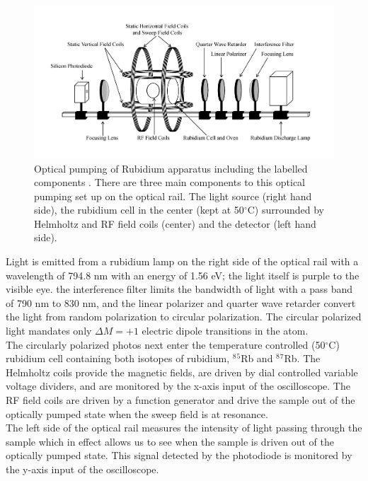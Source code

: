 \documentclass[prb,preprint]{revtex4-1}
\begin{document}
\begin{figure}[h]
\centering
\includegraphics[width=16cm]{exp.jpg}
\caption{Optical pumping of Rubidium apparatus including the labelled components \cite{rib}. There are three main components to this optical pumping set up on the optical rail. The light source (right hand side), the rubidium cell in the center (kept at 50$^{\circ}$C) surrounded by Helmholtz and RF field coils (center) and the detector (left hand side). }
\label{exp}
\end{figure}


Light is emitted from a rubidium lamp on the right side of the optical rail with a wavelength of 794.8 nm with an energy of 1.56 eV; the light itself is purple to the visible eye.  the interference filter limits the bandwidth of light with a pass band of 790 nm to 830 nm, and the linear polarizer and quarter wave retarder convert the light from random polarization to circular polarization. The circular polarized light mandates only $\Delta M=+1$ electric dipole transitions in the atom.\\

The circularly polarized photos next enter the temperature controlled (50$^{\circ}$C) rubidium cell containing both isotopes of rubidium,   $^8$$^5$Rb and $^8$$^7$Rb. The Helmholtz coils provide the magnetic fields, are driven by dial controlled variable voltage dividers, and are monitored by the x-axis input of the oscilloscope. The RF field coils are driven by a function generator and drive the sample out of the optically pumped state when the sweep field is at resonance.\\

The left side of the optical rail measures the intensity of light passing through the sample which in effect allows us to see when the sample is driven out of the optically pumped state. This signal detected by the photodiode is monitored by the y-axis input of the oscilloscope. \\
\end{document}
